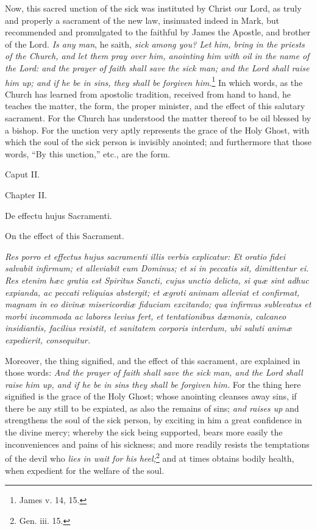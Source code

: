 Now, this sacred unction of the sick was instituted by Christ our Lord, as truly and properly a sacrament of the new law, insinuated indeed in Mark, but recommended and promulgated to the faithful by James the Apostle, and brother of the Lord. \emph{Is any man}, he saith, \emph{sick among you? Let him, bring in the priests of the Church, and let them pray over him, anointing him with oil in the name of the Lord: and the prayer of faith shall save the sick man; and the Lord shall raise him up; and if he be in sins, they shall be forgiven him.}\footnote{\par   James v. 14, 15.} In which words, as the Church has learned from apostolic tradition, received from hand to hand, he teaches the matter, the form, the proper minister, and the effect of this salutary sacrament. For the Church has understood the matter thereof to be oil blessed by a bishop. For the unction very aptly represents the grace of the Holy Ghost, with which the soul of the sick person is invisibly anointed; and furthermore that those words, ``By this unction,'' etc., are the form.

Caput II.

Chapter II.

De effectu hujus Sacramenti.

On the effect of this Sacrament.

\emph{Res porro et effectus hujus sacramenti illis verbis explicatur: Et oratio fidei salvabit infirmum; et alleviabit eum Dominus; et si in peccatis sit, dimittentur ei. Res etenim hæc gratia est Spiritus Sancti, cujus unctio delicta, si quæ sint adhuc expianda, ac peccati reliquias abstergit; et ægroti animam alleviat et confirmat, magnam in eo divinæ misericordiæ fiduciam excitando; qua infirmus sublevatus et morbi incommoda ac labores levius fert, et tentationibus dæmonis, calcaneo insidiantis, facilius resistit, et sanitatem corporis interdum, ubi saluti animæ expedierit, consequitur.}

Moreover, the thing signified, and the effect of this sacrament, are explained in those words: \emph{And the prayer of faith shall save the sick man, and the Lord shall raise him up, and if he be in sins they shall be forgiven him.} For the thing here signified is the grace of the Holy Ghost; whose anointing cleanses away sins, if there be any still to be expiated, as also the remains of sins; \emph{and raises up} and strengthens the soul of the sick person, by exciting in him a great confidence in the divine mercy; whereby the sick being supported, bears more easily the inconveniences and pains of his sickness; and more readily resists the temptations of the devil who \emph{lies in wait for his heel;}\footnote{\par   Gen. iii. 15.} and at times obtains bodily health, when expedient for the welfare of the soul.

